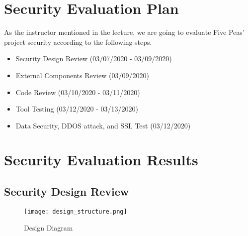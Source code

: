 \documentclass[12pt, a4paper]{article}
\begin{document}

\section{Security Evaluation Plan}


As the instructor mentioned in the lecture, we are going to evaluate Five Peas' project security according to the following steps.

\begin{itemize}
    \item Security Design Review (03/07/2020 - 03/09/2020)
    \item External Components Review (03/09/2020)
    \item Code Review (03/10/2020 - 03/11/2020)
    \item Tool Testing (03/12/2020 - 03/13/2020)
    \item Data Security, DDOS attack, and SSL Test (03/12/2020) 
\end{itemize}
    

\section{Security Evaluation Results}

\subsection{Security Design Review}
\begin{figure}[ht]
\centering
\texttt{[image: design\_structure.png]}
\caption{Design Diagram}
\label{fig:design_diagram}
\end{figure}
\end{document}
